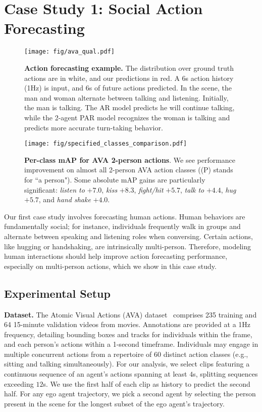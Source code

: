 \section{Case Study 1: Social Action Forecasting}

\begin{figure*}[t]
    \centering
    \texttt{[image: fig/ava\_qual.pdf]}
    \caption{\textbf{Action forecasting example.} The distribution over ground truth actions are in white, and our predictions in red. A 6s action history (1Hz) is input, and 6s of future actions predicted. In the scene, the man and woman alternate between talking and listening. Initially, the man is talking. The AR model predicts he will continue talking, while the 2-agent PAR model recognizes the woman is talking and predicts more accurate turn-taking behavior.}
    \label{fig:ava_qual}
    \vspace{-.6cm}
\end{figure*}


\begin{figure}
    \centering
    \texttt{[image: fig/specified\_classes\_comparison.pdf]}
    \small
    \caption{\textbf{Per-class mAP for AVA 2-person actions}. We see performance improvement on almost all 2-person AVA action classes ((P) stands for ``a person"). Some absolute mAP gains are particularly significant: \textit{listen to} $+7.0$, \textit{kiss} $+8.3$, \textit{fight/hit} $+5.7$, \textit{talk to} $+4.4$, \textit{hug} $+5.7$, and
    \textit{hand shake} $+4.0$.}
\label{fig:ava_2_person_classes}
\vspace{-.5cm}
\end{figure}

Our first case study involves forecasting human actions. Human behaviors are fundamentally social; for instance, individuals frequently walk in groups and alternate between speaking and listening roles when conversing. Certain actions, like hugging or handshaking, are intrinsically multi-person. Therefore, modeling human interactions should help improve action forecasting performance, especially on multi-person actions, which we show in this case study.


\subsection{Experimental Setup}
\noindent \textbf{Dataset.}  The Atomic Visual Actions (AVA) dataset~\citep{gu2018ava} comprises 235 training and 64 15-minute validation videos from movies. Annotations are provided at a 1Hz frequency, detailing bounding boxes and tracks for individuals within the frame, and each person's actions within a 1-second timeframe. Individuals may engage in multiple concurrent actions from a repertoire of 60 distinct action classes (e.g., sitting and talking simultaneously). For our analysis, we select clips featuring a continuous sequence of an agent's actions spanning at least $4$s, splitting sequences exceeding $12$s.  We use the first half of each clip as history to predict the second half. For any ego agent trajectory, we pick a second agent by selecting the person present in the scene for the longest subset of the ego agent's trajectory.

